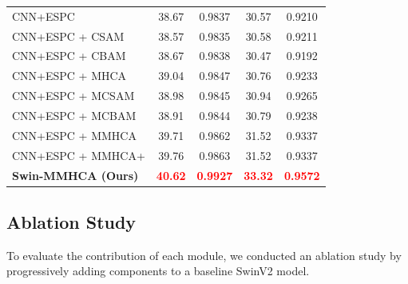 \documentclass{IEEEoj}
\begin{document}
\begin{table}[H]
{\begin{tabular}{lcccc}
\midrule
CNN+ESPC \cite{georgescu2020} & 38.67 & 0.9837 & 30.57 & 0.9210 \\
CNN+ESPC + CSAM \cite{georgescu2020, minet, han} & 38.57 & 0.9835 & 30.58 & 0.9211 \\
CNN+ESPC + CBAM \cite{georgescu2020, cbam} & 38.67 & 0.9838 & 30.47 & 0.9192 \\
CNN+ESPC + MHCA \cite{georgescu2020, Georgescu2023} & 39.04 & 0.9847 & 30.76 & 0.9233 \\
CNN+ESPC + MCSAM \cite{georgescu2020, minet, han} & 38.98 & 0.9845 & 30.94 & 0.9265 \\
CNN+ESPC + MCBAM \cite{georgescu2020, cbam} & 38.91 & 0.9844 & 30.79 & 0.9238 \\
CNN+ESPC + MMHCA \cite{georgescu2020, Georgescu2023} & 39.71 & 0.9862 & 31.52 & 0.9337 \\
CNN+ESPC + MMHCA+ \cite{georgescu2020, Georgescu2023} & 39.76 & 0.9863 & 31.52 & 0.9337 \\
\midrule
\rowcolor{gray!10} \textbf{Swin-MMHCA (Ours)} & \textcolor{red}{\textbf{40.62}} & \textcolor{red}{\textbf{0.9927}} & \textcolor{red}{\textbf{33.32}} & \textcolor{red}{\textbf{0.9572}} \\
\bottomrule
\end{tabular}
}
\end{table}

\subsection{Ablation Study}
To evaluate the contribution of each module, we conducted an ablation study by progressively adding components to a baseline SwinV2 model.

\begin{table}[H]
\centering
\caption{Ablation study of Swin-MMHCA components on IXI dataset.}
\label{tab:ablation}
\end{table}
\end{document}
